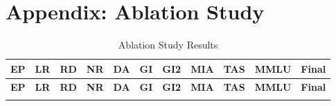 \documentclass[11pt]{article}
\begin{document}


\newpage
\appendix
\onecolumn
\section{Appendix: Ablation Study}\nopagebreak[4]
\label{sec:appendixA}


\begin{longtable}[h]{|r|r|l|l|l|l|l|r|r|l|r|}
\caption{Ablation Study Results} \\
\hline
\multicolumn{1}{|c|}{\textbf{EP}} & \multicolumn{1}{c|}{\textbf{LR}} & \multicolumn{1}{c|}{\textbf{RD}} & \multicolumn{1}{c|}{\textbf{NR}} & \multicolumn{1}{c|}{\textbf{DA}} & \multicolumn{1}{c|}{\textbf{GI}} & \multicolumn{1}{c|}{\textbf{GI2}} & \multicolumn{1}{c|}{\textbf{MIA}} & \multicolumn{1}{c|}{\textbf{TAS}} & \multicolumn{1}{c|}{\textbf{MMLU}} & \multicolumn{1}{c|}{\textbf{Final}} \\ 
\hline
\endfirsthead

\hline
\multicolumn{1}{|c|}{\textbf{EP}} & \multicolumn{1}{c|}{\textbf{LR}} & \multicolumn{1}{c|}{\textbf{RD}} & \multicolumn{1}{c|}{\textbf{NR}} & \multicolumn{1}{c|}{\textbf{DA}} & \multicolumn{1}{c|}{\textbf{GI}} & \multicolumn{1}{c|}{\textbf{GI2}} & \multicolumn{1}{c|}{\textbf{MIA}} & \multicolumn{1}{c|}{\textbf{TAS}} & \multicolumn{1}{c|}{\textbf{MMLU}} & \multicolumn{1}{c|}{\textbf{Final}} \\
\hline
\endhead

\hline
\endfoot


\end{longtable}
\end{document}
